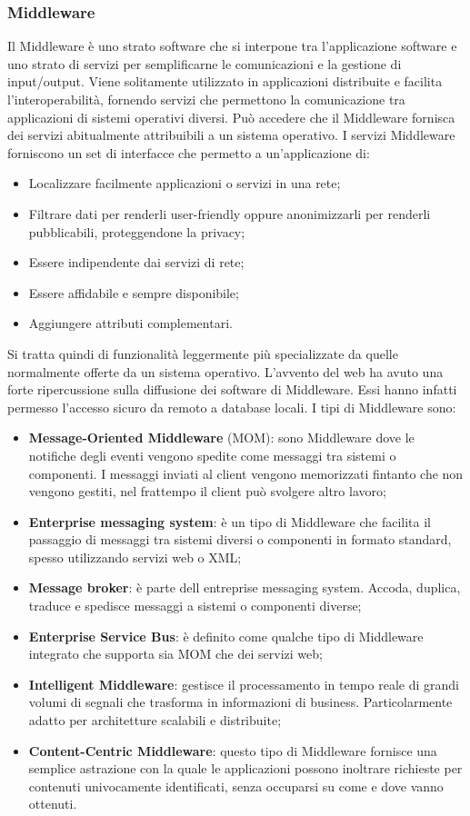 \documentclass[12pt,a4paper]{article}
\begin{document}
\subsubsection{Middleware}
Il Middleware è uno strato software che si interpone tra l’applicazione software e uno strato di servizi per semplificarne le comunicazioni e la gestione di input/output. Viene solitamente utilizzato in applicazioni distribuite e facilita l’interoperabilità, fornendo servizi che permettono la comunicazione tra applicazioni di sistemi operativi diversi. Può accedere che il Middleware fornisca dei servizi abitualmente attribuibili a un sistema operativo. I servizi Middleware forniscono un set di interfacce che permetto a un’applicazione di:
\begin{itemize}
	\item Localizzare facilmente applicazioni o servizi in una rete;
	\item Filtrare dati per renderli user-friendly oppure anonimizzarli per renderli pubblicabili, proteggendone la privacy;
	\item Essere indipendente dai servizi di rete;
	\item Essere affidabile e sempre disponibile;
	\item Aggiungere attributi complementari.
\end{itemize}
Si tratta quindi di funzionalità leggermente più specializzate da quelle normalmente offerte da un sistema operativo. L’avvento del web ha avuto una forte ripercussione sulla diffusione dei software di Middleware. Essi hanno infatti permesso l’accesso sicuro da remoto a database locali. I tipi di Middleware sono:
\begin{itemize}
	\item \textbf{Message-Oriented Middleware} (MOM): sono Middleware dove le notifiche degli	eventi vengono spedite come messaggi tra sistemi o componenti. I messaggi inviati al
	client vengono memorizzati fintanto che non vengono gestiti, nel frattempo il client può	svolgere altro lavoro; 
	\item \textbf{Enterprise messaging system}: è un tipo di Middleware che facilita il passaggio di messaggi tra sistemi diversi o componenti in formato standard, spesso utilizzando servizi web o XML;
	\item \textbf{Message broker}: è parte dell entreprise messaging system. Accoda, duplica, traduce e spedisce messaggi a sistemi o componenti diverse;
	\item \textbf{Enterprise Service Bus}: è definito come qualche tipo di Middleware integrato che supporta sia MOM che dei servizi web;
	\item \textbf{Intelligent Middleware}: gestisce il processamento in tempo reale di grandi volumi di segnali che trasforma in informazioni di business. Particolarmente adatto per architetture scalabili e distribuite;
	\item \textbf{Content-Centric Middleware}: questo tipo di Middleware fornisce una semplice astrazione con la quale le applicazioni possono inoltrare richieste per contenuti univocamente identificati, senza occuparsi su come e dove vanno ottenuti.
\end{itemize}
\end{document}
